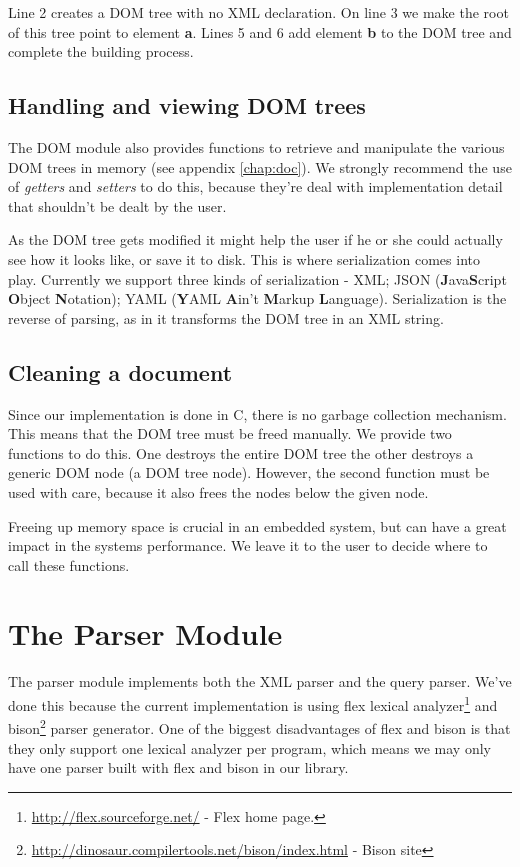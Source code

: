 \documentclass[a4paper]{report}
\begin{document}
		Line 2 creates a DOM tree with no XML declaration. On line 3 we make the root of this tree point to element \textbf{a}. Lines 5 and 6 add element \textbf{b} to the DOM tree and complete the building process.
		
	\subsection{Handling and viewing DOM trees}
		The DOM module also provides functions to retrieve and manipulate the various DOM trees in memory (see appendix \ref{chap:doc}). We strongly recommend the use of \emph{getters} and \emph{setters} to do this,
		because they're deal with implementation detail that shouldn't be dealt by the user.
		
		As the DOM tree gets modified it might help the user if he or she could actually see how it looks like, or save it to disk. This is where serialization comes into play. Currently we support three kinds of serialization - XML; 
		JSON (\textbf{J}ava\textbf{S}cript \textbf{O}bject \textbf{N}otation); YAML (\textbf{Y}AML \textbf{A}in't \textbf{M}arkup \textbf{L}anguage). Serialization is the reverse of parsing, as in it transforms the DOM tree in an XML
		string.
		
	\subsection{Cleaning a document}
		Since our implementation is done in C, there is no garbage collection mechanism. This means that the DOM tree must be freed manually. We provide two functions to do this. One destroys the entire DOM tree the 
		other destroys a generic DOM node (a DOM tree node). However, the second function must be used with care, because it also frees the nodes below the given node.
		
		Freeing up memory space is crucial in an embedded system, but can have a great impact in the systems performance. We leave it to the user to decide where to call these functions.

\section{The Parser Module}\label{sec:parser}
	The parser module implements both the XML parser and the query parser. We've done this because the current implementation is using flex lexical analyzer\footnote{\url{http://flex.sourceforge.net/} - Flex home page.} and 
	bison\footnote{\url{http://dinosaur.compilertools.net/bison/index.html} - Bison site} parser generator. One of the biggest disadvantages of flex and bison is that they only support one lexical analyzer per program, which 
	means we may only have one parser built with flex and bison in our library.
	
\end{document}
